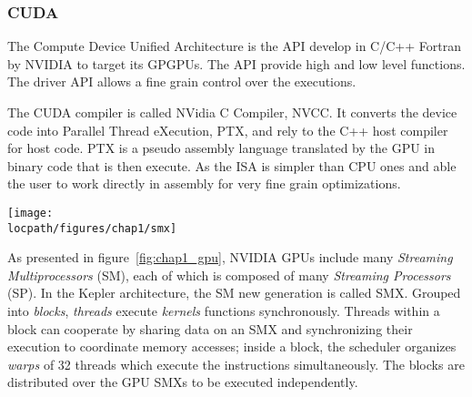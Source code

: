 \subsubsection{CUDA}
\label{sec:CUDA}
The Compute Device Unified Architecture is the API develop in C/C++ Fortran by NVIDIA to target its GPGPUs. 
The API provide high and low level functions. 
The driver API allows a fine grain control over the executions.

The CUDA compiler is called NVidia C Compiler, NVCC. 
It converts the device code into Parallel Thread eXecution, PTX, and rely to the C++ host compiler for host code. 
PTX is a pseudo assembly language translated by the GPU in binary code that is then execute. 
As the ISA is simpler than CPU ones and able the user to work directly in assembly for very fine grain optimizations. 

\begin{figure*}[t!]
\centering
\setlength\fboxsep{0pt}
\setlength\fboxrule{0.25pt}
\texttt{[image: \\locpath/figures/chap1/smx]}
\caption[NVIDIA GPU architecture and CUDA paradigms]{NVIDIA GPU and CUDA architecture overview. The right figure presents a logical view of the architecture of the GPU with the SMs, the processor, memory position. The left figure provides the CUDA paradigms to divide the threads in blocks and the blocks in a grid. The grid is at GPU level, the block is at SM level and the threads are at core level.}
 \label{fig:chap1_gpu}
\end{figure*}

As presented in figure~\ref{fig:chap1_gpu}, NVIDIA GPUs include many \emph{Streaming Multiprocessors} (SM), each of which is composed of many \emph{Streaming Processors} (SP). In the Kepler architecture, the SM new generation is called SMX.
%
Grouped into \emph{blocks}, \textit{threads} execute \emph{kernels} functions synchronously.
Threads within a block can cooperate by sharing data on an SMX and synchronizing their execution to coordinate memory accesses; inside a block, the scheduler organizes \emph{warps} of 32 threads which execute the instructions simultaneously.
The blocks are distributed over the GPU SMXs to be executed independently.


